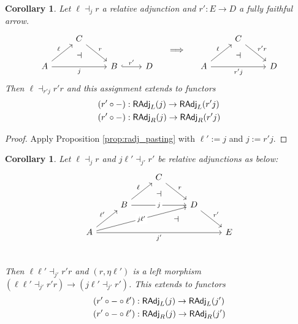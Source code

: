 \documentclass[10pt,a4paper]{article}
\newcommand{\cat}[1]{\textcat{#1}}
\newcommand{\textcat}[1]{{\normalfont\textsf{#1}}}
\theoremstyle{plain}
\newtheorem{corollary}[theorem]{Corollary}
\theoremstyle{definition}
\theoremstyle{remark}
\begin{document}
\begin{corollary}
    Let $\ell\dashv_j r$ a relative adjunction and $r' : E \to D$ a fully faithful arrow.
    \[\begin{tikzcd}
        &C\ar[dr, "r"]&&\\
        A \ar[ur, "\ell"] \ar[rr, "j"'] &{}& B \ar[r, "r'", hook] & D
        \ar[from=1-2, to=2-2, phantom, "\dashv"{anchor=center}]
    \end{tikzcd}
    \hspace{1em}
    \implies
    \hspace{1em}
    \begin{tikzcd}
        &C\ar[dr, "r'r"]&\\
        A \ar[ur, "\ell"] \ar[rr, "r'j"'] &{}& D
        \ar[from=1-2, to=2-2, phantom, "\dashv"{anchor=center}]
    \end{tikzcd}\]
    Then $\ell\dashv_{r'j}r'r$ and this assignment extends to functors
    \begin{align*}
        (r'\circ-) &: \cat{RAdj}_L(j) \to \cat{RAdj}_L(r'j)\\
        (r'\circ-) &: \cat{RAdj}_R(j) \to \cat{RAdj}_R(r'j)
    \end{align*}
\end{corollary}

\begin{proof}
    Apply Proposition \ref{prop:radj_pasting} with $\ell' := j$ and $j := r'j$.
\end{proof}

\begin{corollary}
    Let $\ell\dashv_j r$ and $j\ell'\dashv_{j'} r'$ be relative adjunctions as below:
    \[\begin{tikzcd}
        && C \ar[dr, "r"] &&\\
        & B \ar[ur, "\ell"] \ar[rr, "j"{description}] &{}& D \ar[dr, "r'", ""{anchor=center, name=r_}] &\\
        A \ar[ur, "\ell'"] \ar[urrr, "j\ell'"{description}, ""{anchor=center,name=jl_}] \ar[rrrr, "j'"'] &&&& E\\
        \ar[from=1-3, to=2-3, phantom, "\dashv"{anchor=center}]
        \ar[from=jl_, to=r_, phantom, "\dashv"{anchor=center}]
    \end{tikzcd}\]
    Then $\ell\ell'\dashv_{j'} r'r$ and $(r, \eta\ell')$ is a left morphism $(\ell\ell'\dashv_{j'}r'r) \to (j\ell'\dashv_{j'}r')$. This extends to functors
    \begin{align*}
        (r'\circ-\circ\ell') &: \cat{RAdj}_L(j) \to \cat{RAdj}_L(j')\\
        (r'\circ-\circ\ell') &: \cat{RAdj}_R(j) \to \cat{RAdj}_R(j')
    \end{align*}
\end{corollary}
\end{document}
